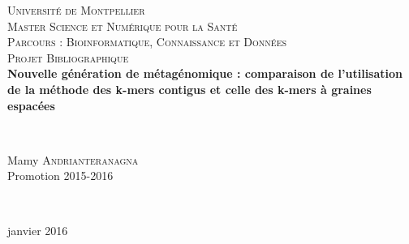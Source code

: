 \begin{titlepage}
  \begin{sffamily}
  \begin{center}


    \textsc{\LARGE Université de Montpellier}\\[2cm]

    \textsc{\Large Master Science et Numérique pour la Santé}\\[0.5cm]
		
		\textsc{\Large Parcours : Bioinformatique, Connaissance et Données}\\[3cm]
		
		\textsc{\Large Projet Bibliographique }\\[1.5cm]


    { \huge \bfseries Nouvelle génération de métagénomique : comparaison de l'utilisation de la méthode des k-mers contigus et celle des k-mers à graines espacées \\[0.1cm] }

    \HRule \\[3cm]


    \begin{minipage}{0.8\textwidth}
      \begin{centering} \large
        Mamy \textsc{Andrianteranagna}\\
        Promotion 2015-2016\\
      \end{centering}
    \end{minipage}\\[3cm]

    \vfill

    
    {\large janvier 2016}

  \end{center}
  \end{sffamily}
\end{titlepage}

